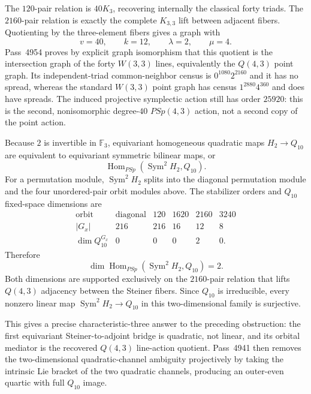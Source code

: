 The $120$-pair relation is $40K_3$, recovering internally the classical forty
triads.  The $2160$-pair relation is exactly the complete $K_{3,3}$ lift
between adjacent fibers.  Quotienting by the three-element fibers gives a
graph with
\[
  v=40,\qquad k=12,\qquad\lambda=2,\qquad\mu=4.
\]
Pass~4954 proves by explicit graph isomorphism that this quotient is the
intersection graph of the forty $W(3,3)$ lines, equivalently the $Q(4,3)$
point graph.  Its independent-triad common-neighbor census is
$0^{1080}2^{2160}$ and it has no spread, whereas the standard $W(3,3)$ point
graph has census $1^{2880}4^{360}$ and does have spreads.  The induced
projective symplectic action still has order $25920$: this is the second,
nonisomorphic degree-$40$ $PSp(4,3)$ action, not a second copy of the point
action.

Because $2$ is invertible in $\mathbb F_3$, equivariant homogeneous quadratic
maps $H_2\to Q_{10}$ are equivalent to equivariant symmetric bilinear maps, or
\[
  \operatorname{Hom}_{PSp}(\operatorname{Sym}^2 H_2,Q_{10}).
\]
For a permutation module, $\operatorname{Sym}^2 H_2$ splits into the diagonal
permutation module and the four unordered-pair orbit modules above.  The
stabilizer orders and $Q_{10}$ fixed-space dimensions are
\[
\begin{array}{c|ccccc}
\text{orbit}&\text{diagonal}&120&1620&2160&3240\\\hline
|G_x|&216&216&16&12&8\\
\dim Q_{10}^{G_x}&0&0&0&2&0.
\end{array}
\]
Therefore
\[
  \boxed{\dim\operatorname{Hom}_{PSp}
  (\operatorname{Sym}^2H_2,Q_{10})=2.}
\]
Both dimensions are supported exclusively on the $2160$-pair relation that
lifts $Q(4,3)$ adjacency between the Steiner fibers.  Since $Q_{10}$ is
irreducible, every nonzero linear map
$\operatorname{Sym}^2H_2\to Q_{10}$ in this two-dimensional family is
surjective.

This gives a precise characteristic-three answer to the preceding obstruction:
the first equivariant Steiner-to-adjoint bridge is quadratic, not linear, and
its orbital mediator is the recovered $Q(4,3)$ line-action quotient.  Pass~4941
then removes the two-dimensional quadratic-channel ambiguity projectively by
taking the intrinsic Lie bracket of the two quadratic channels, producing an
outer-even quartic with full $Q_{10}$ image.

